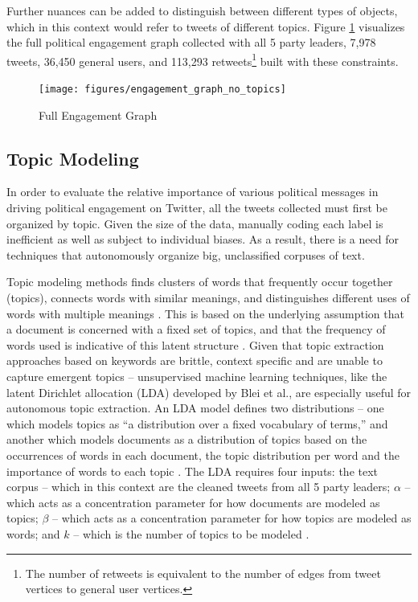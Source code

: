 Further nuances can be added to distinguish between different types of objects,
which in this context would refer to tweets of different topics. Figure
\ref{fig:engagement_graph_no_topics}  visualizes the full political engagement
graph collected with all 5 party leaders, 7,978 tweets, 36,450 general users,
and 113,293 retweets\footnote{The number of retweets is equivalent to the number
of edges from tweet vertices to general user vertices.} built with these constraints.

\begin{figure}[h!]
  \centering
  \texttt{[image: figures/engagement\_graph\_no\_topics]}
  \caption[Full Engagement Graph]{Full Engagement Graph}
  \label{fig:engagement_graph_no_topics}
\end{figure}

\subsection{Topic Modeling}

In order to evaluate the relative importance of various political messages in
driving political engagement on Twitter, all the tweets collected must first be
organized by topic. Given the size of the data, manually coding each label is
inefficient as well as subject to individual biases. As a result, there is a
need for techniques that autonomously organize big, unclassified corpuses of
text. 

Topic modeling methods finds clusters of words that frequently occur together
(topics), connects words with similar meanings, and distinguishes different uses
of words with multiple meanings \cite{alghamdi2015survey}. This is based on the
underlying assumption that a document is concerned with a fixed set of topics,
and that the frequency of words used is indicative of this latent structure
\cite{blei2003latent}. Given that topic extraction approaches based on keywords
are brittle, context specific and are unable to capture emergent topics --
unsupervised machine learning techniques, like the latent Dirichlet allocation
(LDA) developed by Blei et al., are especially useful for autonomous topic
extraction. An LDA model defines two distributions -- one which models topics as
``a distribution over a fixed vocabulary of terms,'' and another which models
documents as a distribution of topics based on the occurrences of words in each
document, the topic distribution per word and the importance of words to each
topic \cite{blei2003latent}. The LDA requires four inputs: the text corpus --
which in this context are the cleaned tweets from all 5 party leaders; $\alpha$
-- which acts as a concentration parameter for how documents are modeled as
topics; $\beta$ -- which acts as a concentration parameter for how topics are
modeled as words; and $k$ -- which is the number of topics to be modeled
\cite{blei2003latent}.

